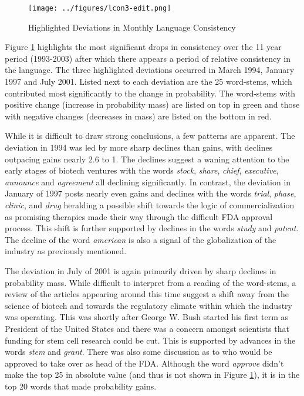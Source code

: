 \begin{landscape}
\begin{figure}
\begin{center}
\texttt{[image: ../figures/lcon3-edit.png]}
\caption[Highlighted Deviations in Monthly Language Consistency]{Highlighted Deviations in Monthly Language Consistency\label{lcon3}}
\end{center}
\end{figure}
\end{landscape}

Figure \ref{lcon3} highlights the most significant drops in consistency over the 11 year period (1993-2003) after which there appears a period of relative consistency in the language. The three highlighted deviations occurred in March 1994, January 1997 and July 2001. Listed next to each deviation are the 25 word-stems, which contributed most significantly to the change in probability. The word-stems with positive change (increase in probability mass) are listed on top in green and those with negative changes (decreases in mass) are listed on the bottom in red. 

While it is difficult to draw strong conclusions, a few patterns are apparent. The deviation in 1994 was led by more  sharp declines than gains, with declines outpacing gains nearly 2.6 to 1. The declines suggest a waning attention to the early stages of biotech ventures with the words \emph{stock}, \emph{share}, \emph{chief}, \emph{executive}, \emph{announce} and \emph{agreement} all declining significantly. In contrast, the deviation in January of 1997 posts nearly even gains and declines with the words \emph{trial}, \emph{phase}, \emph{clinic}, and \emph{drug} heralding a possible shift towards the logic of commercialization as promising therapies made their way through the difficult FDA approval process. This shift is further supported by declines in the words \emph{study} and \emph{patent}. The decline of the word \emph{american} is also a signal of the globalization of the industry as previously mentioned.

The deviation in July of 2001 is again primarily driven by sharp declines in probability mass. While difficult to interpret from a reading of the word-stems, a review of the articles appearing around this time suggest a shift away from the science of biotech and towards the regulatory climate within which the industry was operating. This was shortly after George W. Bush started his first term as President of the United States and there was a concern amongst scientists that funding for stem cell research could be cut. This is supported by advances in the words \emph{stem} and \emph{grant}. There was also some discussion as to who would be approved to take over as head of the FDA. Although the word \emph{approve} didn't make the top 25 in absolute value (and thus is not shown in Figure \ref{lcon3}), it is in the top 20 words that made probability gains.


